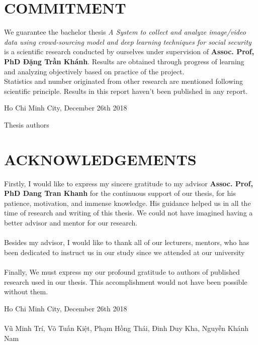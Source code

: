 \documentclass[a4paper,12pt,oneside]{ThesisStyle}
\begin{document}


\dominitoc


\cleardoublepage

\chapter*{COMMITMENT}
We guarantee the bachelor thesis \textit{A System to collect and analyze image/video data using crowd-sourcing model and deep learning techniques for social security} is a scientific research conducted by ourselves under supervision of \textbf{Assoc. Prof, PhD Đặng Trần Khánh}. Results are obtained through progress of learning and analyzing objectively based on practice of the project. 
\\
Statistics and number originated from other research are mentioned following scientific principle. Results in this report haven't been published in any report.

\begin{flushright}
Ho Chi Minh City, December 26th 2018
\end{flushright}
\hspace{11cm} Thesis authors \\
\vspace{3cm}

\cleardoublepage

\chapter*{ACKNOWLEDGEMENTS}
Firstly, I would like to express my sincere gratitude to my advisor \textbf{Assoc. Prof, PhD Dang Tran Khanh} for the continuous support of our thesis, for his patience, motivation, and immense knowledge. His guidance helped us in all the time of research and writing of this thesis. We could not have imagined having a better advisor and mentor for our research.
\\
\\
Besides my advisor, I would like to thank all of our lecturers, mentors, who has been dedicated to instruct us in our study since we attended at our university
\\
\\
Finally, We must express my our profound gratitude to authors of published research used in our thesis. This accomplishment would not have been possible without them.

\begin{flushright}
Ho Chi Minh City, December 26th 2018 \\
\hfill \\
Vũ Minh Trí, Võ Tuấn Kiệt, Phạm Hồng Thái, Đinh Duy Kha, Nguyễn Khánh Nam
\end{flushright}
\end{document}
